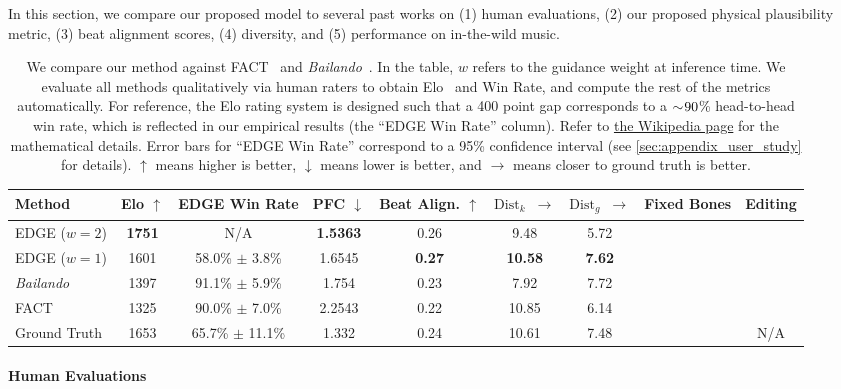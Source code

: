\documentclass[10pt,twocolumn,letterpaper]{article}
\newcommand{\cmark}{\ding{51}}%
\newcommand{\xmark}{\ding{55}}%
\newcommand{\distk}{$\text{Dist}_k$~}
\newcommand{\distg}{$\text{Dist}_g$~}
\begin{document}
In this section, we compare our proposed model to several past works on (1) human evaluations, (2) our proposed physical plausibility metric, (3) beat alignment scores, (4) diversity, and (5) performance on in-the-wild music.

\begin{table}[t]
  \centering
  \begin{tabular}{lcccccccc}
    \toprule
    Method & Elo $\uparrow$ & EDGE Win Rate & PFC $\downarrow$ & Beat Align. $\uparrow$ & \distk $\xrightarrow[]{}$ & \distg $\xrightarrow[]{}$ & Fixed Bones & Editing \\
    \midrule
    EDGE ($w=2$) & \textbf{1751} & N/A & \textbf{1.5363} & 0.26 & 9.48 & 5.72 & \cmark & \cmark \\
    EDGE ($w=1$) & 1601 & 58.0\% $\pm$ 3.8\% & 1.6545 & \textbf{0.27} & \textbf{10.58} & \textbf{7.62} & \cmark & \cmark \\
    \midrule
    \textit{Bailando} & 1397 & 91.1\% $\pm$ 5.9\% & 1.754 & 0.23 & 7.92 & 7.72 & \xmark & \xmark \\
    FACT & 1325 & 90.0\% $\pm$ 7.0\% & 2.2543 & 0.22 & 10.85 & 6.14 & \cmark & \xmark \\
    \midrule Ground Truth & 1653 & 65.7\% $\pm$ 11.1\% & 1.332 & 0.24 & 10.61 & 7.48 & \cmark & N/A \\
    \bottomrule
\end{tabular}
    \caption{We compare our method against FACT~\cite{li2021ai} and \textit{Bailando}~\cite{siyao2022bailando}.
    In the table, $w$ refers to the guidance weight at inference time.
    We evaluate all methods qualitatively via human raters to obtain Elo~\cite{elo1978rating} and Win Rate, and compute the rest of the metrics automatically.
    For reference, the Elo rating system is designed such that a 400 point gap corresponds to a $\sim\hspace{-2pt}90$\% head-to-head win rate, which is reflected in our empirical results (the ``EDGE Win Rate'' column).
    Refer to \href{https://en.wikipedia.org/wiki/Elo_rating_system}{the Wikipedia page} for the mathematical details.
    Error bars for ``EDGE Win Rate'' correspond to a 95\% confidence interval (see \cref{sec:appendix_user_study} for details).
    $\uparrow$ means higher is better, $\downarrow$ means lower is better, and $\xrightarrow[]{}$ means closer to ground truth is better.
    }
    \label{tab:main_table}
  \end{table}
\vspace{-10pt}
\paragraph{Human Evaluations}
\label{par:human_evaluations}
\end{document}
